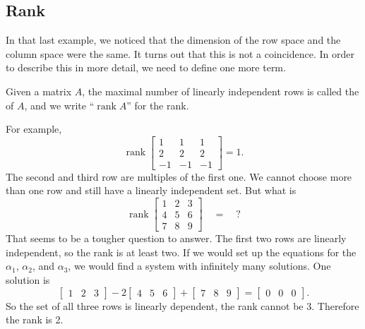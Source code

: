 \documentclass{ximera}
\begin{document}
\subsection{Rank}
In that last example, we noticed that the dimension of the row space and the column space were the same. It turns out that this is not a coincidence. In order to describe this in more detail, we need to define one more term.

\begin{definition}
    Given a matrix $A$, the maximal number of linearly independent rows is called the \emph{} of $A$, and we write ``$\operatorname{rank} A$'' for the rank.
\end{definition}
For example,
\begin{equation*}
    \operatorname{rank}
    \begin{bmatrix}
        1 & 1 & 1 \\
        2 & 2 & 2 \\
        -1 & -1 & -1
    \end{bmatrix}
    = 1 .
\end{equation*}
The second and third row are multiples of the first one.  We cannot choose more than one row and still have a linearly independent set.   But what is
\begin{equation*}
    \operatorname{rank}
    \begin{bmatrix}
        1 & 2 & 3 \\
        4 & 5 & 6 \\
        7 & 8 & 9
    \end{bmatrix} \quad = \quad ?
\end{equation*}
That seems to be a tougher question to answer.  The first two rows are linearly independent, so the rank is at least two.  If we would set up the equations for the $\alpha_1$, $\alpha_2$, and $\alpha_3$, we would find a system with infinitely many solutions.  One solution is
\begin{equation*}
    \begin{bmatrix}
        1 & 2 & 3
    \end{bmatrix} -2
    \begin{bmatrix}
        4 & 5 & 6 
    \end{bmatrix} +
    \begin{bmatrix}
        7 & 8 & 9
    \end{bmatrix} =
    \begin{bmatrix}
        0 & 0 & 0
    \end{bmatrix} .
\end{equation*}
So the set of all three rows is linearly dependent, the rank cannot be 3. Therefore the rank is 2.
\end{document}
